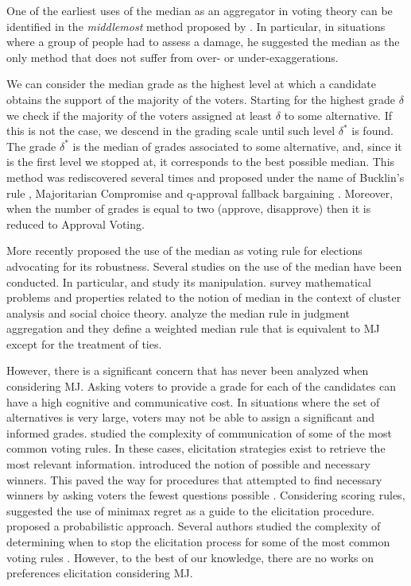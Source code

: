 One of the earliest uses of the median as an aggregator in voting theory can be identified in the \textit{middlemost} method proposed by \citet{Galton1907a,Galton1907b}. In particular, in situations where a group of people had to assess a damage, he suggested the median as the only method that does not suffer from over- or under-exaggerations.

We can consider the median grade as the highest level at which a candidate obtains the support of the majority of the voters. Starting for the highest grade $\delta$ we check if the majority of the voters assigned at least $\delta$ to some alternative. If this is not the case, we descend in the grading scale until such level $\delta^*$ is found. The grade $\delta^*$ is the median of grades associated to some alternative, and, since it is the first level we stopped at, it corresponds to the best possible median. This method was rediscovered several times and proposed under the name of Bucklin's rule \citep{Hoag1926}, Majoritarian Compromise \citep{Sertel1986,Sertel1999} and q-approval fallback bargaining \citep{Brams2001}. Moreover, when the number of grades is equal to two (approve, disapprove) then it is reduced to Approval Voting.

More recently \citet{Bassett1999} proposed the use of the median as voting rule for elections advocating for its robustness.
Several studies on the use of the median have been conducted. In particular, \citet{Bassett1994} and \citet{Gehrlein2003} study its manipulation. \citet{Barthelemy1981} survey mathematical problems and properties related to the notion of median in the context of cluster analysis and social choice theory. \cite{Nehring2022} analyze the median rule in judgment aggregation and they define a weighted median rule that is equivalent to \acs{MJ} except for the treatment of ties.

However, there is a significant concern that has never been analyzed when considering \ac{MJ}. Asking voters to provide a grade for each of the candidates can have a high cognitive and communicative cost. In situations where the set of alternatives is very large, voters may not be able to assign a significant and informed grades. \citet{Conitzer2005} studied the complexity of communication of some of the most common voting rules.
In these cases, elicitation strategies exist to retrieve the most relevant information. \citet{Konczak05} introduced the notion of possible and necessary winners. This paved the way for procedures that attempted to find necessary winners by asking voters the fewest questions possible \citep{Kalech2011}.
Considering scoring rules, \citet{Lu2011} suggested the use of minimax regret as a guide to the elicitation procedure. \citet{Bachrach2010} proposed a probabilistic approach. Several authors studied the complexity of determining when to stop the elicitation process for some of the most common voting rules \citep{Conitzer2002, Walsh2009}.
However, to the best of our knowledge, there are no works on preferences elicitation considering \ac{MJ}.

